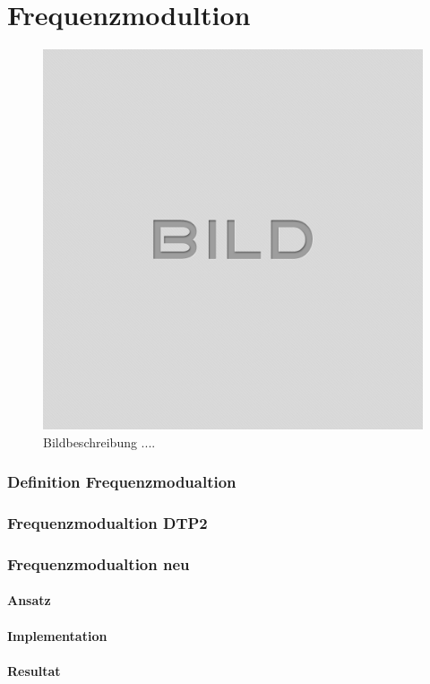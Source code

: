 
\chapter{Frequenzmodultion}\label{chap.frequenzmodulation}

\begin{figure}[H]
	\centering
	\includegraphics[width=\textwidth]{images/idle.png}
	\caption{Bildbeschreibung ....}
	\label{fig.fm_}
\end{figure}

\subsection{Definition Frequenzmodualtion}\label{sect.fm_definition}

\subsection{Frequenzmodualtion DTP2}\label{sect.fm_DTP2}


\subsection{Frequenzmodualtion neu}\label{sect.fm_neu}
\subsubsection{Ansatz}\label{sect.fm_neu.ansatz}
\subsubsection{Implementation}\label{sect.fm_neu.implementation}
\subsubsection{Resultat}\label{sect.fm_neu.resultat}